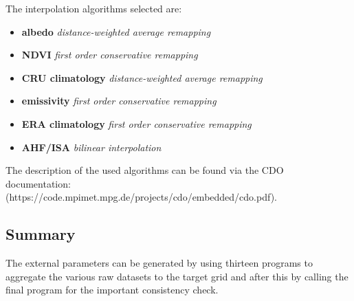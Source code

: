 \documentclass[a4paper,10pt,DIV14,BCOR1cm,titlepage,twoside]{scrartcl}
\begin{document}
\noindent The interpolation algorithms selected are:

\begin{itemize}
\item \textbf{albedo} \textit{distance-weighted average remapping}
\item \textbf{NDVI} \textit{first order conservative remapping}
\item \textbf{CRU climatology} \textit{distance-weighted average remapping}
\item \textbf{emissivity} \textit{first order conservative remapping}
\item \textbf{ERA climatology} \textit{first order conservative remapping}
\item \textbf{AHF/ISA} \textit{bilinear interpolation}
\end{itemize}

The description of the used algorithms can be found via the CDO
documentation: 
\\
(https://code.mpimet.mpg.de/projects/cdo/embedded/cdo.pdf).
\\



\subsection{Summary}\label{Summary}
The external parameters can be generated by using thirteen programs to aggregate the various raw datasets to the target grid and after this by calling the final program for the important consistency check.
\end{document}
